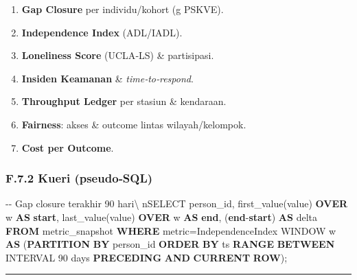 \documentclass[
  letterpaper,
  DIV=11,
  numbers=noendperiod]{scrartcl}
\newenvironment{Shaded}{\begin{snugshade}}{\end{snugshade}}
\newcommand{\CommentTok}[1]{\textcolor[rgb]{0.37,0.37,0.37}{#1}}
\newcommand{\ControlFlowTok}[1]{\textcolor[rgb]{0.00,0.23,0.31}{\textbf{#1}}}
\newcommand{\DataTypeTok}[1]{\textcolor[rgb]{0.68,0.00,0.00}{#1}}
\newcommand{\FunctionTok}[1]{\textcolor[rgb]{0.28,0.35,0.67}{#1}}
\newcommand{\KeywordTok}[1]{\textcolor[rgb]{0.00,0.23,0.31}{\textbf{#1}}}
\newcommand{\NormalTok}[1]{\textcolor[rgb]{0.00,0.23,0.31}{#1}}
\newcommand{\OperatorTok}[1]{\textcolor[rgb]{0.37,0.37,0.37}{#1}}
\newcommand{\StringTok}[1]{\textcolor[rgb]{0.13,0.47,0.30}{#1}}
\providecommand{\tightlist}{%
  \setlength{\itemsep}{0pt}\setlength{\parskip}{0pt}}
\begin{document}
\begin{enumerate}
\def\labelenumi{\arabic{enumi}.}
\tightlist
\item
  \textbf{Gap Closure} per individu/kohort (\textbar g\textbar{} PSKVE).
\item
  \textbf{Independence Index} (ADL/IADL).
\item
  \textbf{Loneliness Score} (UCLA‑LS) \& partisipasi.
\item
  \textbf{Insiden Keamanan} \& \emph{time‑to‑respond}.
\item
  \textbf{Throughput Ledger} per stasiun \& kendaraan.
\item
  \textbf{Fairness}: akses \& outcome lintas wilayah/kelompok.
\item
  \textbf{Cost per Outcome}.
\end{enumerate}

\subsubsection{F.7.2 Kueri (pseudo‑SQL)}\label{f.7.2-kueri-pseudosql}

\begin{Shaded}
\begin{Highlighting}[]
\CommentTok{{-}{-} Gap closure terakhir 90 hari\textbackslash{} nSELECT person\_id,}
  \FunctionTok{first\_value}\NormalTok{(}\FunctionTok{value}\NormalTok{) }\KeywordTok{OVER}\NormalTok{ w }\KeywordTok{AS} \KeywordTok{start}\NormalTok{,}
  \FunctionTok{last\_value}\NormalTok{(}\FunctionTok{value}\NormalTok{) }\KeywordTok{OVER}\NormalTok{ w }\KeywordTok{AS} \ControlFlowTok{end}\NormalTok{,}
\NormalTok{  (}\ControlFlowTok{end}\OperatorTok{{-}}\KeywordTok{start}\NormalTok{) }\KeywordTok{AS}\NormalTok{ delta}
\KeywordTok{FROM}\NormalTok{ metric\_snapshot}
\KeywordTok{WHERE}\NormalTok{ metric}\OperatorTok{=}\StringTok{\textquotesingle{}IndependenceIndex\textquotesingle{}}
\NormalTok{WINDOW w }\KeywordTok{AS}\NormalTok{ (}\KeywordTok{PARTITION} \KeywordTok{BY}\NormalTok{ person\_id }\KeywordTok{ORDER} \KeywordTok{BY}\NormalTok{ ts}
  \KeywordTok{RANGE} \KeywordTok{BETWEEN} \DataTypeTok{INTERVAL} \StringTok{\textquotesingle{}90 days\textquotesingle{}} \KeywordTok{PRECEDING} \KeywordTok{AND} \KeywordTok{CURRENT} \KeywordTok{ROW}\NormalTok{);}
\end{Highlighting}
\end{Shaded}

\begin{center}\rule{0.5\linewidth}{0.5pt}\end{center}
\end{document}
